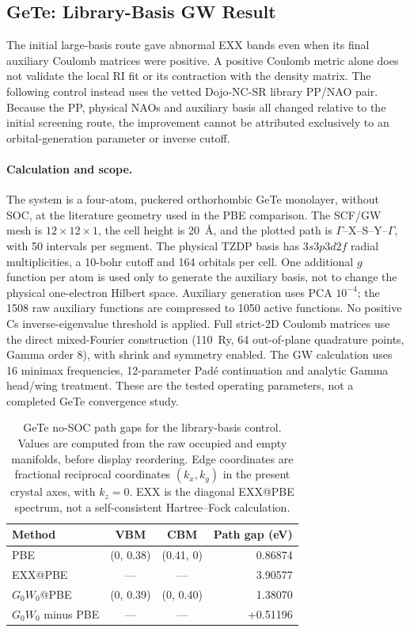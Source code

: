 \clearpage
\subsection{GeTe: Library-Basis GW Result}
\label{sec:gete-library-gw}

The initial large-basis route gave abnormal EXX bands even when its final
auxiliary Coulomb matrices were positive.  A positive Coulomb metric alone
does not validate the local RI fit or its contraction with the density
matrix.  The following control instead uses the vetted Dojo-NC-SR library
PP/NAO pair.  Because the PP, physical NAOs and auxiliary basis all changed
relative to the initial screening route, the improvement cannot be
attributed exclusively to an orbital-generation parameter or inverse cutoff.

\paragraph{Calculation and scope.}
The system is a four-atom, puckered orthorhombic GeTe monolayer, without SOC,
at the literature geometry used in the PBE comparison.  The SCF/GW mesh is
\(12\times12\times1\), the cell height is 20~\AA, and the plotted path is
\(\Gamma\)--X--S--Y--\(\Gamma\), with 50 intervals per segment.
The physical TZDP basis has \(3s3p3d2f\) radial multiplicities, a 10-bohr
cutoff and 164 orbitals per cell.  One additional \(g\) function per atom
is used only to generate the auxiliary basis, not to change the physical
one-electron Hilbert space.  Auxiliary generation uses PCA \(10^{-4}\);
the 1508 raw auxiliary functions are compressed to 1050 active functions.
No positive Cs inverse-eigenvalue threshold is applied.
Full strict-2D Coulomb matrices use the direct mixed-Fourier construction
(110~Ry, 64 out-of-plane quadrature points, Gamma order 8), with shrink and
symmetry enabled.  The GW calculation uses 16 minimax frequencies,
12-parameter Pad\'{e} continuation and analytic Gamma head/wing treatment.
These are the tested operating parameters, not a completed GeTe convergence
study.

\begin{table}[!ht]
  \centering
  \caption{GeTe no-SOC path gaps for the library-basis control.  Values are
  computed from the raw occupied and empty manifolds, before display
  reordering.  Edge coordinates are fractional reciprocal coordinates
  \((k_x,k_y)\) in the present crystal axes, with \(k_z=0\).
  EXX is the diagonal EXX@PBE spectrum, not a self-consistent
  Hartree--Fock calculation.}
  \label{tab:gete-library-gw-gaps}
  \begin{tabular}{lccr}
    \toprule
    Method & VBM & CBM & Path gap (eV) \\
    \midrule
    PBE & (0, 0.38) & (0.41, 0) & 0.86874 \\
    EXX@PBE & --- & --- & 3.90577 \\
    \(G_0W_0\)@PBE & (0, 0.39) & (0, 0.40) & 1.38070 \\
    \(G_0W_0\) minus PBE & --- & --- & +0.51196 \\
    \bottomrule
  \end{tabular}
\end{table}
\FloatBarrier

